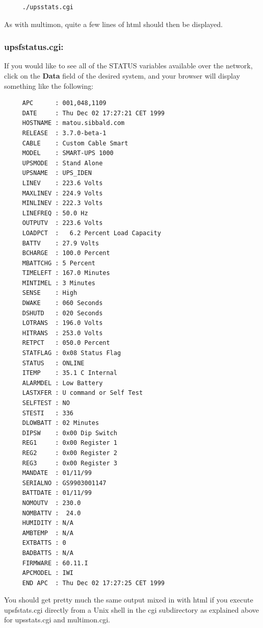 {{{{{{{\label{_005f_002fupsstats_005fcgi}

\begin{verbatim}
     ./upsstats.cgi
\end{verbatim}

\label{index-upssstats-130}
\label{index-CGI_002c-upssstats-131}
As with multimon, quite a few lines of html should then be displayed. 

\label{upsfstatus_005fcgi}

\subsubsection*{upsfstatus.cgi:}

\label{index-upsfstatus-132}
\label{index-CGI_002c-upsfstatus-133}
If you would like to see all of the STATUS variables available over the
network, click on the {\bf Data} field of the desired system, and your browser
will display something like the following: 

\footnotesize
\begin{verbatim}
     APC      : 001,048,1109
     DATE     : Thu Dec 02 17:27:21 CET 1999
     HOSTNAME : matou.sibbald.com
     RELEASE  : 3.7.0-beta-1
     CABLE    : Custom Cable Smart
     MODEL    : SMART-UPS 1000
     UPSMODE  : Stand Alone
     UPSNAME  : UPS_IDEN
     LINEV    : 223.6 Volts
     MAXLINEV : 224.9 Volts
     MINLINEV : 222.3 Volts
     LINEFREQ : 50.0 Hz
     OUTPUTV  : 223.6 Volts
     LOADPCT  :   6.2 Percent Load Capacity
     BATTV    : 27.9 Volts
     BCHARGE  : 100.0 Percent
     MBATTCHG : 5 Percent
     TIMELEFT : 167.0 Minutes
     MINTIMEL : 3 Minutes
     SENSE    : High
     DWAKE    : 060 Seconds
     DSHUTD   : 020 Seconds
     LOTRANS  : 196.0 Volts
     HITRANS  : 253.0 Volts
     RETPCT   : 050.0 Percent
     STATFLAG : 0x08 Status Flag
     STATUS   : ONLINE
     ITEMP    : 35.1 C Internal
     ALARMDEL : Low Battery
     LASTXFER : U command or Self Test
     SELFTEST : NO
     STESTI   : 336
     DLOWBATT : 02 Minutes
     DIPSW    : 0x00 Dip Switch
     REG1     : 0x00 Register 1
     REG2     : 0x00 Register 2
     REG3     : 0x00 Register 3
     MANDATE  : 01/11/99
     SERIALNO : GS9903001147
     BATTDATE : 01/11/99
     NOMOUTV  : 230.0
     NOMBATTV :  24.0
     HUMIDITY : N/A
     AMBTEMP  : N/A
     EXTBATTS : 0
     BADBATTS : N/A
     FIRMWARE : 60.11.I
     APCMODEL : IWI
     END APC  : Thu Dec 02 17:27:25 CET 1999
\end{verbatim}
\normalsize

You should get pretty much the same output mixed in with html if you execute
upsfstats.cgi directly from a Unix shell in the cgi subdirectory as explained
above for upsstats.cgi and multimon.cgi. 

}}}}}}}
